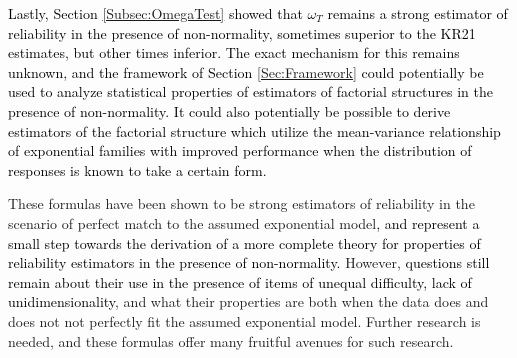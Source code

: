 \documentclass[12pt,epsfig]{article}
\newcommand{\changed}[1]{\textcolor{black}{#1}}
\begin{document}
\changed{Lastly, Section \ref{Subsec:OmegaTest} showed that $\omega_T$ remains a strong estimator of reliability in the presence of non-normality, sometimes superior to the KR21 estimates, but other times inferior. The exact mechanism for this remains unknown, and the framework of Section \ref{Sec:Framework} could potentially be used to analyze statistical properties of estimators of factorial structures in the presence of non-normality. It could also potentially be possible to derive estimators of the factorial structure which utilize the mean-variance relationship of exponential families with improved performance when the distribution of responses is known to take a certain form.}

These formulas have been shown to be strong estimators of reliability in the scenario of perfect match to the assumed exponential model\changed{, and represent a small step towards the derivation of a more complete theory for properties of reliability estimators in the presence of non-normality.} However,  \changed{questions still remain about their use in the presence of items of unequal difficulty, lack of unidimensionality}, and what their properties are both when the data does and does not not perfectly fit the assumed exponential model. Further research is needed, and these formulas offer many fruitful avenues for such research.




\clearpage
\end{document}
